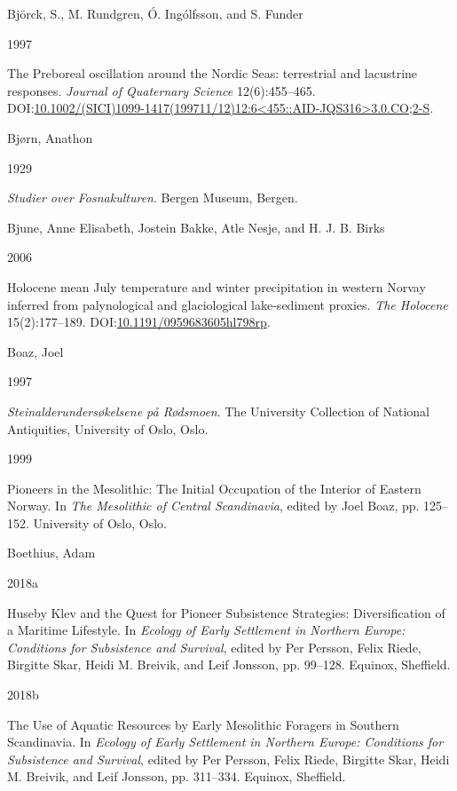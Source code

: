 \documentclass[
  12pt,
  a4paper,
  oneside]{book}
\newlength{\cslhangindent}
\newlength{\csllabelwidth}
\newlength{\cslentryspacingunit} %
\newenvironment{CSLReferences}[2] %
 {%
  \setlength{\parindent}{0pt}
  \ifodd #1
  \let\oldpar\par
  \def\par{\hangindent=\cslhangindent\oldpar}
  \fi
  \setlength{\parskip}{#2\cslentryspacingunit}
 }%
 {}
\newcommand{\CSLBlock}[1]{#1\hfill\break}
\newcommand{\CSLLeftMargin}[1]{\parbox[t]{\csllabelwidth}{#1}}
\newcommand{\CSLRightInline}[1]{\parbox[t]{\linewidth - \csllabelwidth}{#1}\break}
\begin{document}
\begin{CSLReferences}{0}{0}
\leavevmode{}%
\CSLBlock{Björck, S., M. Rundgren, Ó. Ingólfsson, and S. Funder}
\CSLLeftMargin{ 1997}
\CSLRightInline{{The Preboreal oscillation around the Nordic Seas: terrestrial and lacustrine responses}. \emph{Journal of Quaternary Science} 12(6):455--465. DOI:\href{https://doi.org/10.1002/(SICI)1099-1417(199711/12)12:6\%3C455::AID-JQS316\%3E3.0.CO;2-S}{10.1002/(SICI)1099-1417(199711/12)12:6\textless455::AID-JQS316\textgreater3.0.CO;2-S}.}

\leavevmode{}%
\CSLBlock{Bjørn, Anathon}
\CSLLeftMargin{ 1929}
\CSLRightInline{\emph{{Studier over Fosnakulturen}}. Bergen Museum, Bergen.}

\leavevmode{}%
\CSLBlock{Bjune, Anne Elisabeth, Jostein Bakke, Atle Nesje, and H. J. B. Birks}
\CSLLeftMargin{ 2006}
\CSLRightInline{{Holocene mean July temperature and winter precipitation in western Norvay inferred from palynological and glaciological lake-sediment proxies}. \emph{The Holocene} 15(2):177--189. DOI:\href{https://doi.org/10.1191/0959683605hl798rp}{10.1191/0959683605hl798rp}.}

\leavevmode{}%
\CSLBlock{Boaz, Joel}
\CSLLeftMargin{ 1997}
\CSLRightInline{\emph{{Steinalderundersøkelsene på Rødsmoen}}. The University Collection of National Antiquities, University of Oslo, Oslo.}

\leavevmode{}%
\CSLLeftMargin{ 1999 }
\CSLRightInline{{Pioneers in the Mesolithic: The Initial Occupation of the Interior of Eastern Norway}. In \emph{{The Mesolithic of Central Scandinavia}}, edited by Joel Boaz, pp. 125--152. University of Oslo, Oslo.}

\leavevmode{}%
\CSLBlock{Boethius, Adam}
\CSLLeftMargin{ 2018a}
\CSLRightInline{{Huseby Klev and the Quest for Pioneer Subsistence Strategies: Diversification of a Maritime Lifestyle}. In \emph{{Ecology of Early Settlement in Northern Europe: Conditions for Subsistence and Survival}}, edited by Per Persson, Felix Riede, Birgitte Skar, Heidi M. Breivik, and Leif Jonsson, pp. 99--128. Equinox, Sheffield.}

\leavevmode{}%
\CSLLeftMargin{ 2018b }
\CSLRightInline{{The Use of Aquatic Resources by Early Mesolithic Foragers in Southern Scandinavia}. In \emph{{Ecology of Early Settlement in Northern Europe: Conditions for Subsistence and Survival}}, edited by Per Persson, Felix Riede, Birgitte Skar, Heidi M. Breivik, and Leif Jonsson, pp. 311--334. Equinox, Sheffield.}


\end{CSLReferences}
\end{document}
